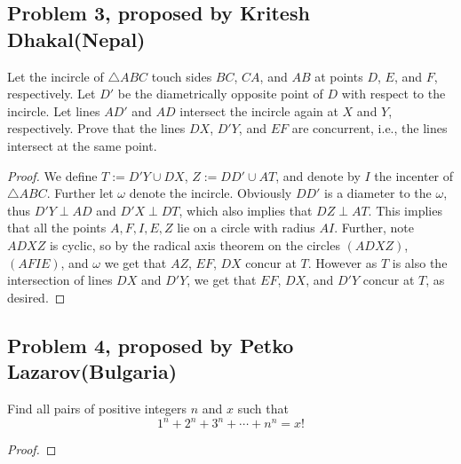 \documentclass[11pt]{scrartcl}
\begin{document}
\newpage{}

\subsection{Problem 3, proposed by Kritesh Dhakal(Nepal)}

\begin{problem}
    Let the incircle of $\triangle ABC$ touch sides $BC$, $CA$, and $AB$ at points $D$, $E$, and $F$, respectively. Let $D'$ be the diametrically
    opposite point of $D$ with respect to the incircle. Let lines $AD'$ and $AD$ intersect the incircle again at $X$ and $Y$, respectively.
    Prove that the lines $DX$, $D'Y$, and $EF$ are concurrent, i.e., the lines intersect at the same point.
\end{problem}

\begin{proof}
    We define $T := D'Y \cup DX$, $Z := DD' \cup AT$, and denote by $I$ the incenter of $\triangle ABC$. Further let $\omega$ denote the
    incircle. \newline \newline
    Obviously $DD'$ is a diameter to the $\omega$, thus $D'Y \perp AD$ and $D'X \perp DT$, which also implies that $DZ \perp AT$. 
    This implies that all the points $A, F, I, E, Z$ lie on a circle with radius $AI$. Further, note $ADXZ$ is cyclic, 
    so by the radical axis theorem on the circles $(ADXZ)$, $(AFIE)$, and $\omega$ we get that $AZ$, $EF$, $DX$ concur at $T$.
    However as $T$ is also the intersection of lines $DX$ and $D'Y$, we get that $EF$, $DX$, and $D'Y$ concur at $T$,
    as desired.
\end{proof}

\newpage{}

\subsection{Problem 4, proposed by Petko Lazarov(Bulgaria)}

\begin{problem}
    Find all pairs of positive integers \( n \) and \( x \) such that
    \[
    1^n + 2^n + 3^n + \cdots + n^n = x!
    \]
\end{problem}

\begin{proof}

\end{proof}
\end{document}
